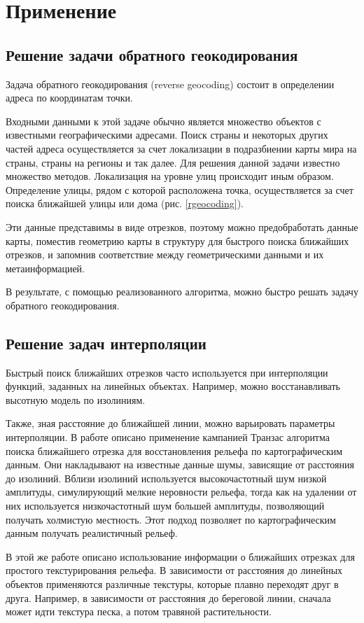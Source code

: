 \chapter{Применение}
\section{Решение задачи обратного геокодирования}
Задача обратного геокодирования (reverse geocoding) состоит в
определении адреса по координатам точки.

Входными данными к этой задаче обычно является множество объектов
с известными географическими адресами. Поиск страны и некоторых других частей
адреса осуществляется за счет локализации в подразбиении карты мира на страны, 
страны на регионы и так далее. Для решения данной задачи известно множество методов.
Локализация на уровне улиц происходит иным образом. Определение улицы, рядом с 
которой расположена точка, осуществляется за счет поиска ближайшей улицы или дома (рис. \ref{rgeocoding}).

Эти данные представимы в виде отрезков, поэтому можно предобработать данные карты,
поместив геометрию карты в структуру для быстрого поиска ближайших отрезков, и запомнив
соответствие между геометрическими данными и их метаинформацией.

В результате, с помощью реализованного алгоритма, можно быстро решать задачу обратного геокодирования.


\FloatBarrier
\section{Решение задач интерполяции}
Быстрый поиск ближайших отрезков часто используется при интерполяции
функций, заданных на линейных объектах. Например, можно
восстанавливать высотную модель по изолиниям.

Также, зная расстояние до ближайшей линии, можно варьировать параметры
интерполяции. В работе \cite{NGRID} описано применение кампанией Транзас алгоритма
поиска ближайшего отрезка для восстановления рельефа по
картографическим данным. Они накладывают на известные данные шумы,
зависящие от расстояния до изолиний. Вблизи изолиний используется
высокочастотный шум низкой амплитуды, симулирующий мелкие неровности
рельефа, тогда как на удалении от них используется низкочастотный шум
большей амплитуды, позволяющий получать холмистую местность. Этот
подход позволяет по картографическим данным получать реалистичный
рельеф.

В этой же работе описано использование информации о ближайших отрезках
для простого текстурирования рельефа. В зависимости от расстояния до
линейных объектов применяются различные текстуры, которые плавно
переходят друг в друга. Например, в зависимости от расстояния до
береговой линии, сначала может идти текстура песка, а потом травяной растительности.

\FloatBarrier
